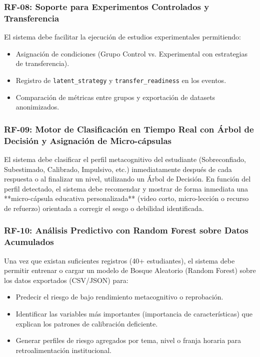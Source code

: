 \documentclass[11pt,a4paper]{article}
\begin{document}
\subsubsection{RF-08: Soporte para Experimentos Controlados y Transferencia}

El sistema debe facilitar la ejecución de estudios experimentales permitiendo:

\begin{itemize}
    \item Asignación de condiciones (Grupo Control vs. Experimental con estrategias de transferencia).
    \item Registro de \texttt{latent\_strategy} y \texttt{transfer\_readiness} en los eventos.
    \item Comparación de métricas entre grupos y exportación de datasets anonimizados.
\end{itemize}

\subsubsection{RF-09: Motor de Clasificación en Tiempo Real con Árbol de Decisión y Asignación de Micro-cápsulas}

El sistema debe clasificar el perfil metacognitivo del estudiante (Sobreconfiado, Subestimado, Calibrado, Impulsivo, etc.) inmediatamente después de cada respuesta o al finalizar un nivel, utilizando un Árbol de Decisión. En función del perfil detectado, el sistema debe recomendar y mostrar de forma inmediata una **micro-cápsula educativa personalizada** (video corto, micro-lección o recurso de refuerzo) orientada a corregir el sesgo o debilidad identificada.

\subsubsection{RF-10: Análisis Predictivo con Random Forest sobre Datos Acumulados}

Una vez que existan suficientes registros (40+ estudiantes), el sistema debe permitir entrenar o cargar un modelo de Bosque Aleatorio (Random Forest) sobre los datos exportados (CSV/JSON) para:
\begin{itemize}
    \item Predecir el riesgo de bajo rendimiento metacognitivo o reprobación.
    \item Identificar las variables más importantes (importancia de características) que explican los patrones de calibración deficiente.
    \item Generar perfiles de riesgo agregados por tema, nivel o franja horaria para retroalimentación institucional.
\end{itemize}
\end{document}
